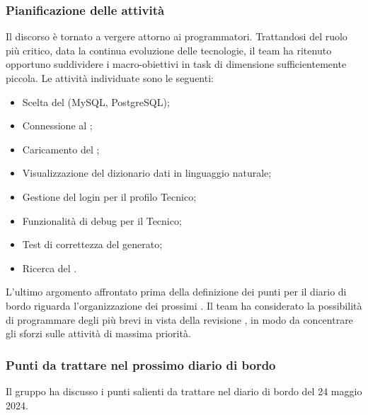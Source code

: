 \subsubsection{Pianificazione delle attività}
\par Il discorso è tornato a vergere attorno ai programmatori. Trattandosi del ruolo più critico, data la continua evoluzione delle tecnologie, il team ha ritenuto opportuno suddividere i macro-obiettivi in task di dimensione sufficientemente piccola. Le attività individuate sono le seguenti:
\begin{itemize}
	\item Scelta del  (MySQL, PostgreSQL);
	\item Connessione al ;
	\item Caricamento del ;
	\item Visualizzazione del dizionario dati in linguaggio naturale;
	\item Gestione del login per il profilo Tecnico; 
	\item Funzionalità di debug per il Tecnico;
	\item Test di correttezza del  generato;
	\item Ricerca del .
\end{itemize}
\par L'ultimo argomento affrontato prima della definizione dei punti per il diario di bordo riguarda l'organizzazione dei prossimi . Il team ha considerato la possibilità di programmare degli  più brevi in vista della revisione , in modo da concentrare gli sforzi sulle attività di massima priorità.

\subsubsection{Punti da trattare nel prossimo diario di bordo}
\par Il gruppo ha discusso i punti salienti da trattare nel diario di bordo del 24 maggio 2024.
